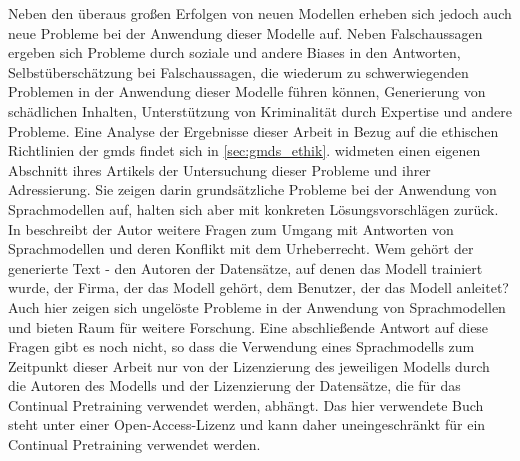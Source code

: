 Neben den überaus großen Erfolgen von neuen Modellen erheben sich jedoch auch neue Probleme bei der Anwendung dieser Modelle auf.
Neben Falschaussagen ergeben sich Probleme durch soziale und andere Biases in den Antworten, Selbstüberschätzung bei Falschaussagen, die wiederum zu schwerwiegenden Problemen in der Anwendung dieser Modelle führen können, Generierung von schädlichen Inhalten, Unterstützung von Kriminalität durch Expertise und andere Probleme. Eine Analyse der Ergebnisse dieser Arbeit in Bezug auf die ethischen Richtlinien der \ac{gmds} findet sich in \ref{sec:gmds_ethik}.
\citet{gpt4} widmeten einen eigenen Abschnitt ihres Artikels der Untersuchung dieser Probleme und ihrer Adressierung.
Sie zeigen darin grundsätzliche Probleme bei der Anwendung von Sprachmodellen auf, halten sich aber mit konkreten Lösungsvorschlägen zurück.\\

In \citet{plagiarism} beschreibt der Autor weitere Fragen zum Umgang mit Antworten von Sprachmodellen und deren Konflikt mit dem Urheberrecht.
Wem gehört der generierte Text - den Autoren der Datensätze, auf denen das Modell trainiert wurde, der Firma, der das Modell gehört, dem Benutzer, der das Modell anleitet? 
Auch hier zeigen sich ungelöste Probleme in der Anwendung von Sprachmodellen und bieten Raum für weitere Forschung. Eine abschließende Antwort auf diese Fragen gibt es noch nicht, so dass die Verwendung eines Sprachmodells zum Zeitpunkt dieser Arbeit nur von der Lizenzierung des jeweiligen Modells durch die Autoren des Modells und der Lizenzierung der Datensätze, die für das Continual Pretraining verwendet werden, abhängt. Das hier verwendete Buch \citet{bb} steht unter einer Open-Access-Lizenz und kann daher uneingeschränkt für ein Continual Pretraining verwendet werden.\\
